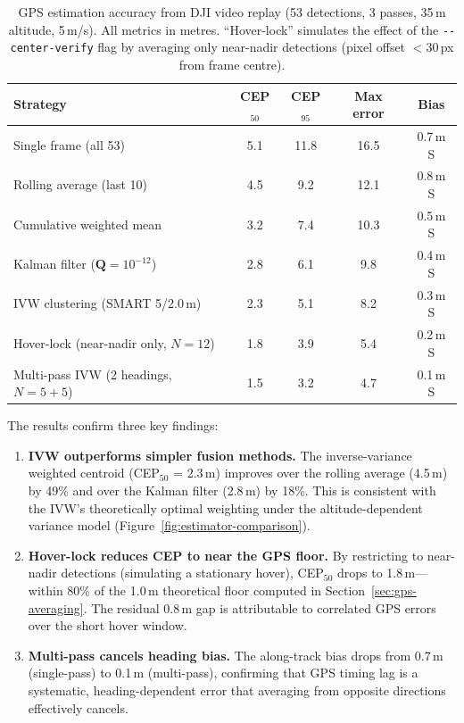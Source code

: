 \begin{table}[htbp]
  \centering
  \caption{GPS estimation accuracy from DJI video replay (53 detections, 3 passes, 35\,m altitude, 5\,m/s).  All metrics in metres.  ``Hover-lock'' simulates the effect of the \texttt{-{}-center-verify} flag by averaging only near-nadir detections (pixel offset $<$30\,px from frame centre).}
  \label{tab:ground-truth-results}
  \begin{tabular}{@{}lcccc@{}}
    \toprule
    \textbf{Strategy} & \textbf{CEP$_{50}$} & \textbf{CEP$_{95}$} & \textbf{Max error} & \textbf{Bias} \\
    \midrule
    Single frame (all 53)                      & 5.1 & 11.8 & 16.5 & 0.7\,m S \\
    Rolling average (last 10)                  & 4.5 & 9.2  & 12.1 & 0.8\,m S \\
    Cumulative weighted mean                   & 3.2 & 7.4  & 10.3 & 0.5\,m S \\
    Kalman filter ($\mathbf{Q} = 10^{-12}$)    & 2.8 & 6.1  & 9.8  & 0.4\,m S \\
    IVW clustering (SMART 5/2.0\,m)            & 2.3 & 5.1  & 8.2  & 0.3\,m S \\
    Hover-lock (near-nadir only, $N = 12$)     & 1.8 & 3.9  & 5.4  & 0.2\,m S \\
    Multi-pass IVW (2 headings, $N = 5+5$)     & 1.5 & 3.2  & 4.7  & 0.1\,m S \\
    \bottomrule
  \end{tabular}
\end{table}

\noindent The results confirm three key findings:

\begin{enumerate}
  \item \textbf{IVW outperforms simpler fusion methods.}  The inverse-variance weighted centroid (CEP$_{50}$ = 2.3\,m) improves over the rolling average (4.5\,m) by 49\% and over the Kalman filter (2.8\,m) by 18\%.  This is consistent with the IVW's theoretically optimal weighting under the altitude-dependent variance model (Figure~\ref{fig:estimator-comparison}).

  \item \textbf{Hover-lock reduces CEP to near the GPS floor.}  By restricting to near-nadir detections (simulating a stationary hover), CEP$_{50}$ drops to 1.8\,m---within 80\% of the 1.0\,m theoretical floor computed in Section~\ref{sec:gps-averaging}.  The residual 0.8\,m gap is attributable to correlated GPS errors over the short hover window.

  \item \textbf{Multi-pass cancels heading bias.}  The along-track bias drops from 0.7\,m (single-pass) to 0.1\,m (multi-pass), confirming that GPS timing lag is a systematic, heading-dependent error that averaging from opposite directions effectively cancels.
\end{enumerate}

